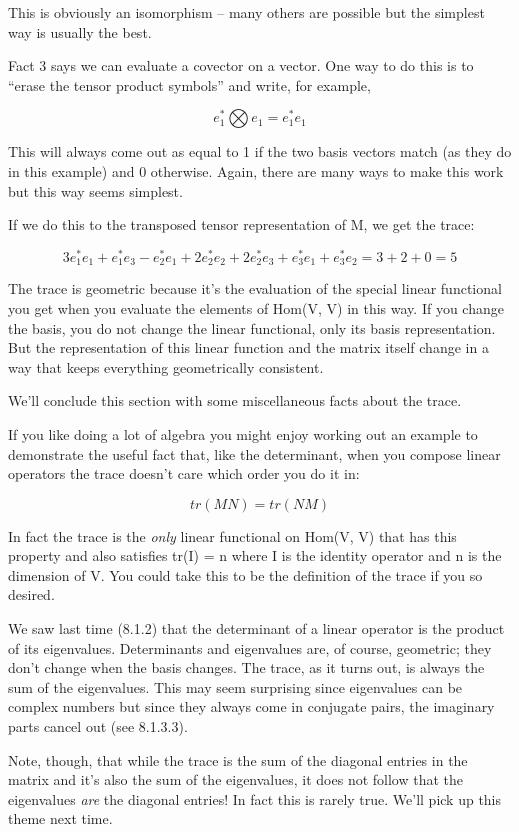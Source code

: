 \documentclass[oneside,english]{amsbook}
\numberwithin{section}{chapter}
\theoremstyle{plain}
\theoremstyle{definition}
\begin{document}
This is obviously an isomorphism -- many others are possible but the
simplest way is usually the best.

Fact 3 says we can evaluate a covector on a vector. One way to do this
is to ``erase the tensor product symbols'' and write, for example,

\[e_{1}^{*}\bigotimes e_{1} = e_{1}^{*}e_{1}\]

This will always come out as equal to 1 if the two basis vectors match
(as they do in this example) and 0 otherwise. Again, there are many ways
to make this work but this way seems simplest.

If we do this to the transposed tensor representation of M, we get the
trace:

\[3e_{1}^{*}e_{1} + e_{1}^{*}e_{3} - e_{2}^{*}e_{1} + 2e_{2}^{*}e_{2} + 2e_{2}^{*}e_{3} + e_{3}^{*}e_{1} + e_{3}^{*}e_{2} = 3 + 2 + 0 = 5\]

The trace is geometric because it's the evaluation of the special linear
functional you get when you evaluate the elements of Hom(V, V) in this
way. If you change the basis, you do not change the linear functional,
only its basis representation. But the representation of this linear
function and the matrix itself change in a way that keeps everything
geometrically consistent.

We'll conclude this section with some miscellaneous facts about the
trace.

If you like doing a lot of algebra you might enjoy working out an
example to demonstrate the useful fact that, like the determinant, when
you compose linear operators the trace doesn't care which order you do
it in:

\[tr(MN) = tr(NM)\]

In fact the trace is the \emph{only} linear functional on Hom(V, V) that
has this property and also satisfies tr(I) = n where I is the identity
operator and n is the dimension of V. You could take this to be the
definition of the trace if you so desired.

We saw last time (8.1.2) that the determinant of a linear operator is
the product of its eigenvalues. Determinants and eigenvalues are, of
course, geometric; they don't change when the basis changes. The trace,
as it turns out, is always the sum of the eigenvalues. This may seem
surprising since eigenvalues can be complex numbers but since they
always come in conjugate pairs, the imaginary parts cancel out (see
8.1.3.3).

Note, though, that while the trace is the sum of the diagonal entries in
the matrix and it's also the sum of the eigenvalues, it does not follow
that the eigenvalues \emph{are} the diagonal entries! In fact this is
rarely true. We'll pick up this theme next time.
\end{document}
